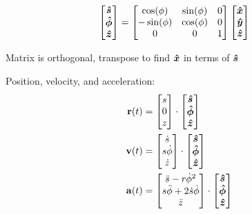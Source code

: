     \begin{align*}
        \begin{bmatrix}
        \e{s}\\
        \e{\phi}\\
        \e{z}
        \end{bmatrix}
        &=
        \begin{bmatrix}
        \cos(\phi)&\sin(\phi)&0\\
        -\sin(\phi)&\cos(\phi)&0\\
        0&0&1
        \end{bmatrix}
        \begin{bmatrix}
        \e{x}\\
        \e{y}\\
        \e{z}
        \end{bmatrix}
    \end{align*}
    \begin{center}
    Matrix is orthogonal, transpose to find $\e{x}$ in terms of $\e{s}$
    \vspace{0.5 cm}
    \end{center}
    Position, velocity, and acceleration:
    \begin{align*}
        \vb{r}(t)&=
        \begin{bmatrix}
            s
            \\
            0
            \\
            z
        \end{bmatrix}
        \cdot
        \begin{bmatrix}
            \e{s}
            \\
            \e{\phi}
            \\
            \e{z}
        \end{bmatrix}
        \\
        \vb{v}(t)&=
        \begin{bmatrix}
            \dot{s}
            \\
            s\dot{\phi}
            \\
            \dot{z}
        \end{bmatrix}
        \cdot
        \begin{bmatrix}
            \e{s}
            \\
            \e{\phi}
            \\
            \e{z}
        \end{bmatrix}
        \\
        \vb{a}(t)&=
        \begin{bmatrix}
            \Ddot{s}-r\dot{\phi}^2
            \\
            s\Ddot{\phi}+2\dot{s}\dot{\phi}
            \\
            \Ddot{z}
        \end{bmatrix}
        \cdot
        \begin{bmatrix}
            \e{s}
            \\
            \e{\phi}
            \\
            \e{z}
        \end{bmatrix}
    \end{align*}
